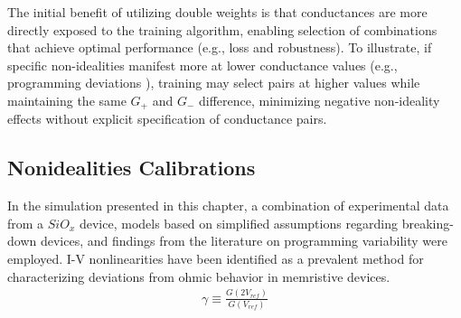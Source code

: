 
\noindent The initial benefit of utilizing double weights is that conductances are more directly exposed to the training algorithm, enabling selection of combinations that achieve optimal performance (e.g., loss and robustness). To illustrate, if specific non-idealities manifest more at lower conductance values (e.g., programming deviations \cite{kim2016voltage}), training may select pairs at higher values while maintaining the same $G_+$ and $G_-$ difference, minimizing negative non-ideality effects without explicit specification of conductance pairs.\\


\subsection[Nonidealities Calibrations]{Nonidealities Calibrations}

\noindent In the simulation presented in this chapter, a combination of experimental data from a $SiO_x$ device, models based on simplified assumptions regarding breaking-down devices, and findings from the literature on programming variability were employed. I-V nonlinearities have been identified as a prevalent method for characterizing deviations from ohmic behavior in memristive devices.
\begin{align}
\gamma \equiv \frac{G\left( 2V_{ref} \right)}{G\left( V_{ref} \right)}  \label{eq:6.35}
\end{align}

